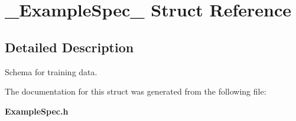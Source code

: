 \section{\_\-Example\-Spec\_\- Struct Reference}
\label{struct__ExampleSpec__}


\subsection{Detailed Description}
Schema for training data. 



The documentation for this struct was generated from the following file:\begin{CompactItemize}
\item 
{\bf Example\-Spec.h}\end{CompactItemize}
